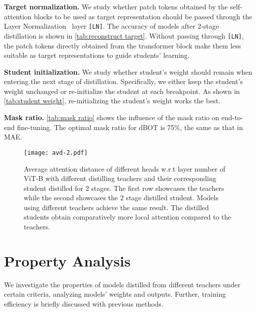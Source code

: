 \documentclass[10pt,twocolumn,letterpaper]{article}
\renewcommand{\paragraph}[1]{\vspace{1.25mm}\noindent\textbf{#1}}
\def\ourmethod{{dBOT}\xspace}
\begin{document}
\paragraph{Target normalization.}
We study whether patch tokens obtained by the self-attention blocks to be used as target representation should be passed through the Layer Normalization~\cite{layernorm} layer \texttt{[LN]}.
The accuracy of models after 2-stage distillation is shown in \cref{tab:reconstruct target}.
Without passing through \texttt{[LN]}, the patch tokens directly obtained from the transformer block make them less suitable as target representations to guide students' learning.

\paragraph{Student initialization.}
We study whether student's weight should remain when entering the next stage of distillation. Specifically, we either keep the student's weight unchanged or re-initialize the student at each breakpoint.
As shown in \cref{tab:student weight}, re-initializing the student's weight works the best.

\paragraph{Mask ratio.}
\cref{tab:mask ratio} shows the influence of the mask ratio on end-to-end fine-tuning.
The optimal mask ratio for \ourmethod is 75\%, the same as that in MAE. 





\begin{figure*}[ht]
    \centering
    \texttt{[image: avd-2.pdf]}
    \caption{Average attention distance of different heads w.r.t layer number of ViT-B with different distilling teachers and their corresponding student distilled for 2 stages. The first row showcases the teachers while the second showcases the 2 stage distilled student. Models using different teachers achieve the same result. The distilled students obtain comparatively more local attention compared to the teachers.}
    \label{fig:avd}
\end{figure*}


\section{Property Analysis}
\label{sec:analysis}
We investigate the properties of models distilled from different teachers under certain criteria, analyzing models' weights and outputs. Further, training efficiency is briefly discussed with previous methods.
\end{document}
